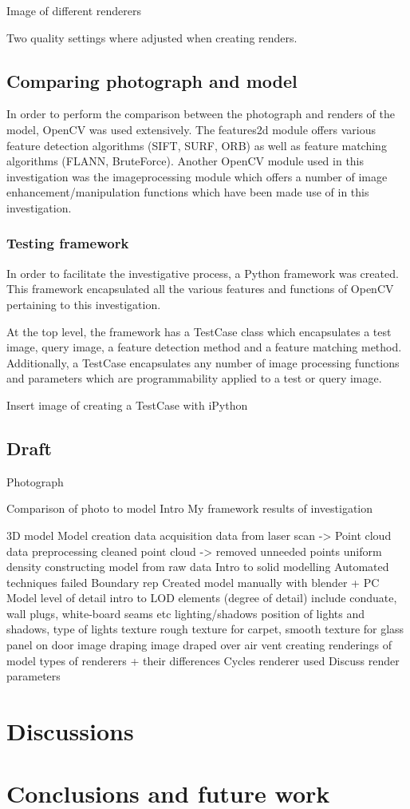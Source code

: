 \documentclass[11pt,a4paper]{report}
\begin{document}
				{{Image of different renderers}}
				
				Two quality settings where adjusted when creating renders.

	\section{Comparing photograph and model}
		In order to perform the comparison between the photograph and renders of the model, OpenCV was used extensively. The features2d module offers various feature detection algorithms (SIFT, SURF, ORB) as well as feature matching algorithms (FLANN, BruteForce). Another OpenCV module used in this investigation was the imageprocessing module which offers a number of image enhancement/manipulation functions which have been made use of in this investigation.
		\subsection{Testing framework}
			In order to facilitate the investigative process, a Python framework was created. This framework encapsulated all the various features and functions of OpenCV pertaining to this investigation.
			
			At the top level, the framework has a TestCase class which encapsulates a test image, query image, a feature detection method and a feature matching method. Additionally, a TestCase encapsulates any number of image processing functions and parameters which are programmability applied to a test or query image. 
			
			{{Insert image of creating a TestCase with iPython}}
	\section{Draft}
		Photograph
		
		Comparison of photo to model
			Intro
			My framework
			results of investigation
		
		3D model
			Model creation
				data acquisition
				data from laser scan -> Point cloud
			data preprocessing
				cleaned point cloud -> removed unneeded points
				uniform density
			constructing model from raw data
				Intro to solid modelling
				Automated techniques failed
				Boundary rep
				Created model manually with blender + PC
			Model level of detail
				intro to LOD
				elements (degree of detail)
					include conduate, wall plugs, white-board seams etc
				lighting/shadows
					position of lights and shadows, type of lights
				texture
					rough texture for carpet, smooth texture for glass panel on door
				image draping
					image draped over air vent
				creating renderings of model
					types of renderers + their differences
					Cycles renderer used
					Discuss render parameters
			
				

\chapter{Discussions}

\chapter{Conclusions and future work}

\newpage
\printbibliography
\end{document}
